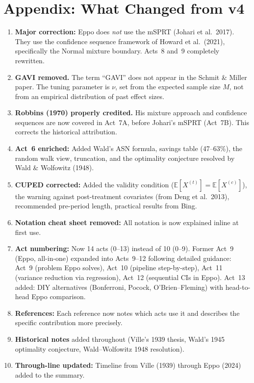 \documentclass[12pt, a4paper]{article}
\newcommand{\E}{\mathbb{E}}            %
\begin{document}
\newpage
\section*{Appendix: What Changed from v4}

\begin{enumerate}[nosep]
  \item \textbf{Major correction:} Eppo does \emph{not} use the mSPRT
        (Johari et al.\ 2017).  They use the confidence sequence framework
        of Howard et al.\ (2021), specifically the Normal mixture boundary.
        Acts~8 and~9 completely rewritten.
  \item \textbf{GAVI removed.}  The term ``GAVI'' does not appear in the
        Schmit \& Miller paper.  The tuning parameter is $\nu$, set from the
        expected sample size $M$, not from an empirical distribution of past
        effect sizes.
  \item \textbf{Robbins (1970) properly credited.}  His mixture approach and
        confidence sequences are now covered in Act~7A, before Johari's mSPRT
        (Act~7B).  This corrects the historical attribution.
  \item \textbf{Act~6 enriched:} Added Wald's ASN formula, savings table
        (47--63\%), the random walk view, truncation, and the optimality
        conjecture resolved by Wald \& Wolfowitz (1948).
  \item \textbf{CUPED corrected:} Added the validity condition
        ($\E[X^{(t)}] = \E[X^{(c)}]$), the warning against post-treatment
        covariates (from Deng et al.\ 2013), recommended pre-period length,
        practical results from Bing.
  \item \textbf{Notation cheat sheet removed:} All notation is now explained
        inline at first use.
  \item \textbf{Act numbering:}  Now 14 acts (0--13) instead of 10 (0--9).
        Former Act~9 (Eppo, all-in-one) expanded into Acts~9--12 following
        detailed guidance: Act~9 (problem Eppo solves), Act~10 (pipeline
        step-by-step), Act~11 (variance reduction via regression), Act~12
        (sequential CIs in Eppo).  Act~13 added: DIY alternatives
        (Bonferroni, Pocock, O'Brien--Fleming) with head-to-head Eppo
        comparison.
  \item \textbf{References:}  Each reference now notes which acts use it and
        describes the specific contribution more precisely.
  \item \textbf{Historical notes} added throughout (Ville's 1939 thesis,
        Wald's 1945 optimality conjecture, Wald--Wolfowitz 1948 resolution).
  \item \textbf{Through-line updated:} Timeline from Ville (1939) through
        Eppo (2024) added to the summary.
\end{enumerate}
\end{document}
